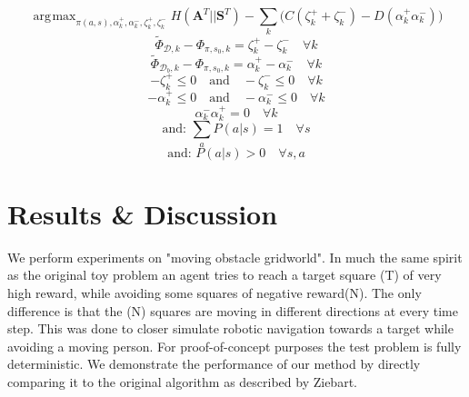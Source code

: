 \documentclass[conference]{IEEEtran}
\DeclareMathOperator*{\argmax}{\arg\!\max}
\begin{document}
	\begin{equation*}
	\argmax_{\pi(a,s),\alpha^+_k ,\alpha^-_k ,\zeta^+_k, \zeta^-_k} H(\mathbf{A}^T||\mathbf{S}^T) - \sum_k\big(C(\zeta^+_k + \zeta^-_k)  -D(\alpha^+_k  \alpha^-_k)\big)
\end{equation*}
\begin{equation*}
	\widetilde{\Phi}_{\mathcal{D},k}-\Phi_{\pi,s_0,k}   = \zeta^+_k  - \zeta^-_k \quad \forall k \label{eq:good_ineq}
\end{equation*}
\begin{equation*}
	\widetilde{\Phi}_{\mathcal{D}_b,k}-\Phi_{\pi,s_0,k}  = \alpha^+_k-\alpha^-_k \quad \forall k \label{eq:bad_ineq}
\end{equation*}
\begin{equation*}
	-\zeta^+_k \leq 0 \quad \text{and} \quad -\zeta^-_k \leq 0 \quad \forall k
\end{equation*}
\begin{equation*}
	-\alpha^+_k \leq 0 \quad \text{and} \quad -\alpha^-_k \leq 0 \quad \forall k
\end{equation*}
\begin{equation*}
	\alpha^-_k \alpha^+_k = 0 \quad \forall k  \label{eq:quadratic}
\end{equation*}
\begin{equation*}
	\text{and:   }\sum_aP(a|s)  = 1 \quad \forall s  
\end{equation*}
\begin{equation*}
	\text{and:   }P(a|s)  > 0 \quad \forall s,a  
\end{equation*}


\section{Results \& Discussion}
We perform experiments on "moving obstacle gridworld". In much the same spirit as the original toy problem an agent tries to reach a target square (T) of very high reward,
while avoiding some squares of negative reward(N). The only difference is that the (N)  squares are moving in different directions at every time step. This was done to closer simulate robotic navigation towards a target while avoiding a moving person. For proof-of-concept purposes the test problem is fully deterministic. We demonstrate the performance of our method by directly comparing it to the original algorithm as described by Ziebart.
%
\end{document}
